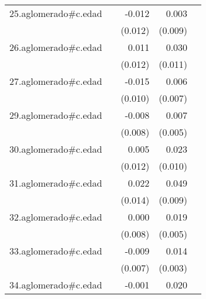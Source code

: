 {\begin{longtable}{l*{4}{D{.}{.}{-1}}}
\addlinespace
25.aglomerado#c.edad&                     &      -0.012         &       0.003         &                     \\
            &                     &     (0.012)         &     (0.009)         &                     \\
\addlinespace
26.aglomerado#c.edad&                     &       0.011         &       0.030\sym{**} &                     \\
            &                     &     (0.012)         &     (0.011)         &                     \\
\addlinespace
27.aglomerado#c.edad&                     &      -0.015         &       0.006         &                     \\
            &                     &     (0.010)         &     (0.007)         &                     \\
\addlinespace
29.aglomerado#c.edad&                     &      -0.008         &       0.007         &                     \\
            &                     &     (0.008)         &     (0.005)         &                     \\
\addlinespace
30.aglomerado#c.edad&                     &       0.005         &       0.023\sym{*}  &                     \\
            &                     &     (0.012)         &     (0.010)         &                     \\
\addlinespace
31.aglomerado#c.edad&                     &       0.022         &       0.049\sym{***}&                     \\
            &                     &     (0.014)         &     (0.009)         &                     \\
\addlinespace
32.aglomerado#c.edad&                     &       0.000         &       0.019\sym{***}&                     \\
            &                     &     (0.008)         &     (0.005)         &                     \\
\addlinespace
33.aglomerado#c.edad&                     &      -0.009         &       0.014\sym{***}&                     \\
            &                     &     (0.007)         &     (0.003)         &                     \\
\addlinespace
34.aglomerado#c.edad&                     &      -0.001         &       0.020\sym{***}&                     \\

\end{longtable}}
